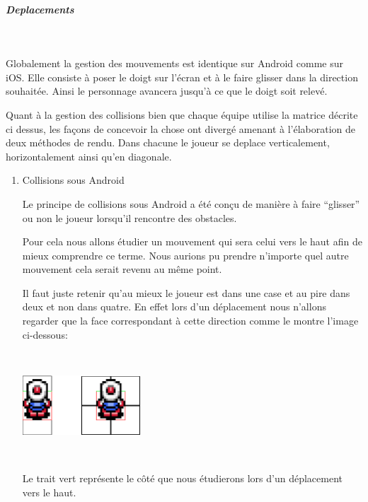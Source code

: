 			\subparagraph{Deplacements\\}
			
				$\,$
			
				Globalement la gestion des mouvements est identique sur Android comme sur
				iOS.
				Elle consiste à poser le doigt sur l'écran et à le faire glisser dans la
				direction souhaitée. Ainsi le personnage avancera jusqu'à ce que le doigt
				soit relevé.				
				
				Quant à la gestion des collisions bien que chaque équipe utilise la matrice
				décrite ci dessus, les façons de concevoir la chose ont divergé amenant à
				l'élaboration de deux méthodes de rendu. Dans chacune le joueur se deplace
				verticalement, horizontalement ainsi qu'en diagonale.
				
				\begin{enumerate}
				  \item Collisions sous Android
				  
				  		Le principe de collisions sous Android a été conçu de manière à faire
				  		``glisser'' ou non le joueur lorsqu'il rencontre des obstacles.
				  		
				  		
				  		Pour cela nous allons étudier un mouvement qui sera celui vers le haut
				  		afin de mieux comprendre ce terme.
				  		Nous aurions pu prendre n'importe quel autre mouvement cela serait
				  		revenu au même point.
				  		
				  		Il faut juste retenir qu'au mieux le joueur est dans une case et au pire
				  		dans deux et non dans quatre. En effet lors d'un déplacement nous
				  		n'allons regarder que la face correspondant à cette direction comme le montre
				  		l'image ci-dessous:
				  		
				  		$\,$
				  		
						\begin{center}						
							\includegraphics[width=168px,height=84px]{Developpement/Img/ex2.eps}
						\end{center}
						
				  		$\,$				  		
				  		
				  		Le trait vert représente le côté que nous étudierons lors d'un
				  		déplacement vers le haut.
				  		

\end{enumerate}
